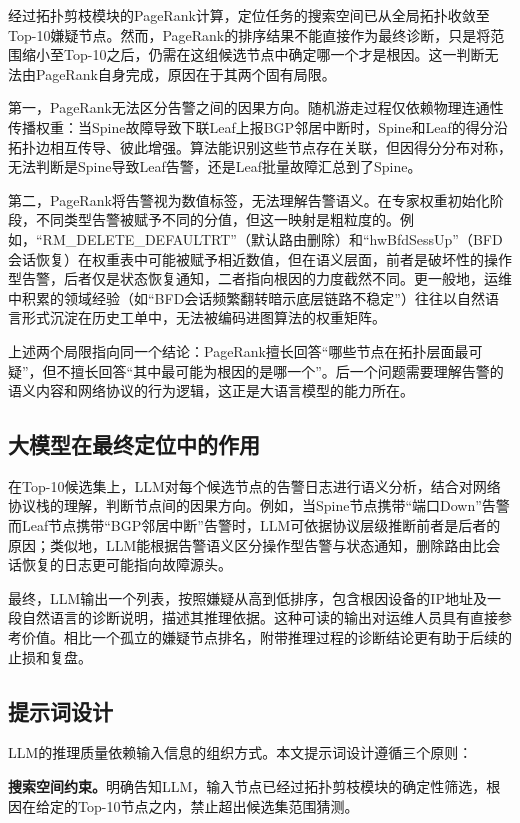 经过拓扑剪枝模块的PageRank计算，定位任务的搜索空间已从全局拓扑收敛至Top-10嫌疑节点。然而，PageRank的排序结果不能直接作为最终诊断，只是将范围缩小至Top-10之后，仍需在这组候选节点中确定哪一个才是根因。这一判断无法由PageRank自身完成，原因在于其两个固有局限。

第一，PageRank无法区分告警之间的因果方向。随机游走过程仅依赖物理连通性传播权重：当Spine故障导致下联Leaf上报BGP邻居中断时，Spine和Leaf的得分沿拓扑边相互传导、彼此增强。算法能识别这些节点存在关联，但因得分分布对称，无法判断是Spine导致Leaf告警，还是Leaf批量故障汇总到了Spine。

第二，PageRank将告警视为数值标签，无法理解告警语义。在专家权重初始化阶段，不同类型告警被赋予不同的分值，但这一映射是粗粒度的。例如，“RM\_DELETE\_DEFAULTRT”（默认路由删除）和“hwBfdSessUp”（BFD会话恢复）在权重表中可能被赋予相近数值，但在语义层面，前者是破坏性的操作型告警，后者仅是状态恢复通知，二者指向根因的力度截然不同。更一般地，运维中积累的领域经验（如“BFD会话频繁翻转暗示底层链路不稳定”）往往以自然语言形式沉淀在历史工单中，无法被编码进图算法的权重矩阵。

上述两个局限指向同一个结论：PageRank擅长回答“哪些节点在拓扑层面最可疑”，但不擅长回答“其中最可能为根因的是哪一个”。后一个问题需要理解告警的语义内容和网络协议的行为逻辑，这正是大语言模型的能力所在。

\subsection{大模型在最终定位中的作用}

在Top-10候选集上，LLM对每个候选节点的告警日志进行语义分析，结合对网络协议栈的理解，判断节点间的因果方向。例如，当Spine节点携带“端口Down”告警而Leaf节点携带“BGP邻居中断”告警时，LLM可依据协议层级推断前者是后者的原因；类似地，LLM能根据告警语义区分操作型告警与状态通知，删除路由比会话恢复的日志更可能指向故障源头。

最终，LLM输出一个列表，按照嫌疑从高到低排序，包含根因设备的IP地址及一段自然语言的诊断说明，描述其推理依据。这种可读的输出对运维人员具有直接参考价值。相比一个孤立的嫌疑节点排名，附带推理过程的诊断结论更有助于后续的止损和复盘。

\subsection{提示词设计}

LLM的推理质量依赖输入信息的组织方式。本文提示词设计遵循三个原则：

\textbf{搜索空间约束。}明确告知LLM，输入节点已经过拓扑剪枝模块的确定性筛选，根因在给定的Top-10节点之内，禁止超出候选集范围猜测。


